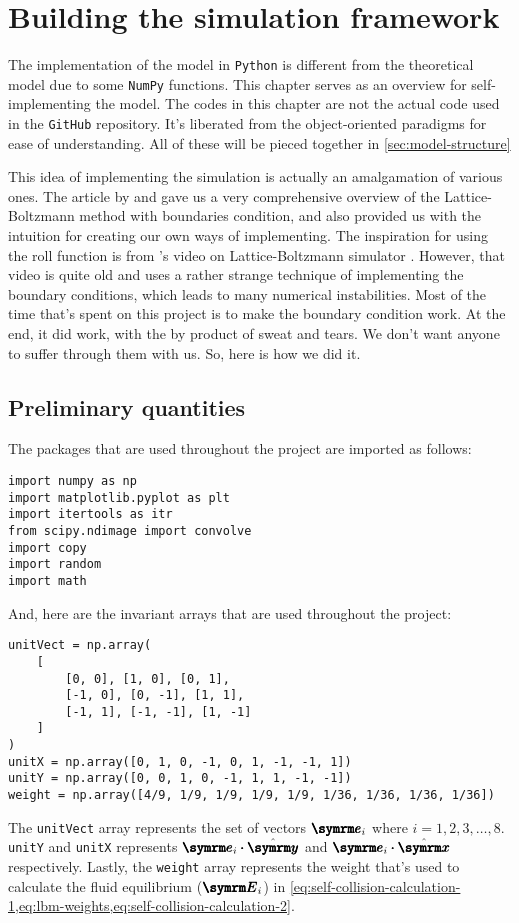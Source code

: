 \chapter{Building the simulation framework}
\label{sec:model-building}

The implementation of the model in \texttt{Python} is different from the theoretical model due to some \texttt{NumPy} functions. This chapter serves as an overview for self-implementing the model. The codes in this chapter are not the actual code used in the \texttt{GitHub} repository. It's liberated from the object-oriented paradigms for ease of understanding. All of these will be pieced together in \cref{sec:model-structure}

This idea of implementing the simulation is actually an amalgamation of various ones. The article by  \cite{adams-no-date} and  \cite{schroeder-2012} gave us a very comprehensive overview of the Lattice-Boltzmann method with boundaries condition, and also provided us with the intuition for creating our own ways of implementing. The inspiration for using the roll function is from 's video on Lattice-Boltzmann simulator \cite{matias-2022}. However, that video is quite old and uses a rather strange technique of implementing the boundary conditions, which leads to many numerical instabilities. Most of the time that's spent on this project is to make the boundary condition work. At the end, it did work, with the by product of sweat and tears. We don't want anyone to suffer through them with us. So, here is how we did it.

\section{Preliminary quantities}

The packages that are used throughout the project are imported as follows:
\begin{verbatim}
import numpy as np
import matplotlib.pyplot as plt
import itertools as itr
from scipy.ndimage import convolve
import copy
import random
import math
\end{verbatim}
And, here are the invariant arrays that are used throughout the project:
\begin{verbatim}
unitVect = np.array(
    [
        [0, 0], [1, 0], [0, 1],
        [-1, 0], [0, -1], [1, 1],
        [-1, 1], [-1, -1], [1, -1]
    ]
)
unitX = np.array([0, 1, 0, -1, 0, 1, -1, -1, 1])
unitY = np.array([0, 0, 1, 0, -1, 1, 1, -1, -1])
weight = np.array([4/9, 1/9, 1/9, 1/9, 1/9, 1/36, 1/36, 1/36, 1/36])
\end{verbatim}
The \texttt{unitVect} array represents the set of vectors $\vv{e}_i$ where $i = 1, 2, 3,\dots, 8$. \texttt{unitY} and \texttt{unitX} represents $\vv{e}_i\vdot\yhat$ and $\vv{e}_i\vdot\xhat$ respectively. Lastly, the \texttt{weight} array represents the weight that's used to calculate the fluid equilibrium ($\vv{E}_i$) in \cref{eq:self-collision-calculation-1,eq:lbm-weights,eq:self-collision-calculation-2}.

